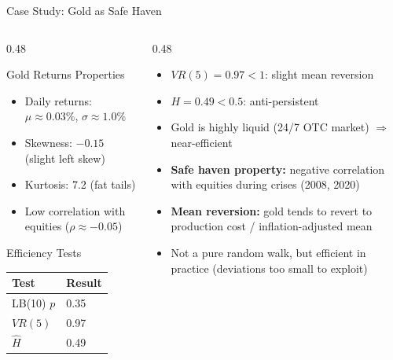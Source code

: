 \documentclass[9pt, aspectratio=169, t]{beamer}
\theoremstyle{definition}
\newenvironment{cminipage}[1]{%
    \par\noindent\hfill\begin{minipage}{#1}\ignorespaces
}{%
    \end{minipage}\hfill\null\par
}
\begin{document}
\begin{frame}{Case Study: Gold as Safe Haven}
\begin{cminipage}{0.95\textwidth}
\small
\begin{columns}[T]
\begin{column}{0.48\textwidth}
\begin{block}{Gold Returns Properties}
\begin{itemize}\setlength{\itemsep}{0pt}
    \item Daily returns: $\mu \approx 0.03\%$, $\sigma \approx 1.0\%$
    \item Skewness: $-0.15$ (slight left skew)
    \item Kurtosis: 7.2 (fat tails)
    \item Low correlation with equities ($\rho \approx -0.05$)
\end{itemize}
\end{block}
\begin{block}{Efficiency Tests}
\footnotesize
\renewcommand{\arraystretch}{1.1}
\begin{tabular}{ll}
\toprule
\textbf{Test} & \textbf{Result} \\
\midrule
LB(10) $p$ & 0.35 \\
$VR(5)$ & 0.97 \\
$\hat{H}$ & 0.49 \\
\bottomrule
\end{tabular}
\end{block}
\end{column}
\begin{column}{0.48\textwidth}
\begin{itemize}\setlength{\itemsep}{0pt}
    \item $VR(5) = 0.97 < 1$: slight mean reversion
    \item $H = 0.49 < 0.5$: anti-persistent
    \item Gold is highly liquid (24/7 OTC market) $\Rightarrow$ near-efficient
    \item \textbf{Safe haven property:} negative correlation with equities during crises (2008, 2020)
    \item \textbf{Mean reversion:} gold tends to revert to production cost / inflation-adjusted mean
    \item Not a pure random walk, but efficient in practice (deviations too small to exploit)
\end{itemize}
\end{column}
\end{columns}
\end{cminipage}
\end{frame}
\end{document}
